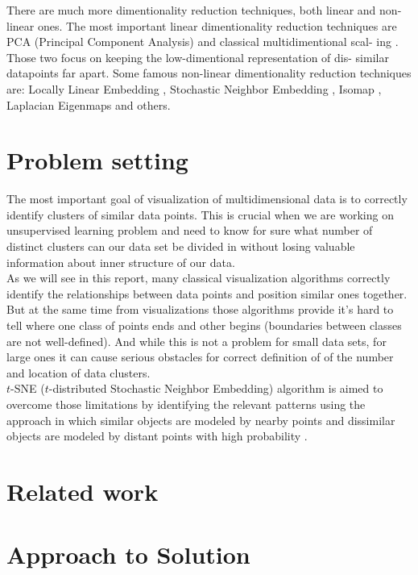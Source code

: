 There are much more dimentionality reduction techniques, both linear and
non-linear ones. The most important linear dimentionality reduction techniques
are PCA (Principal Component Analysis)\cite{pca} and classical multidimentional scal-
ing \cite{mds}. Those two focus on keeping the low-dimentional representation of dis-
similar datapoints far apart. Some famous non-linear dimentionality reduction
techniques are: Locally Linear Embedding \cite{lle}, Stochastic Neighbor Embedding \cite{snearticle}, Isomap \cite{isomap}, Laplacian Eigenmaps \cite{lapeig} and others.

\section{Problem setting}

The most important goal of visualization of multidimensional data is to correctly identify clusters of similar data points. This is crucial when we are working on unsupervised learning problem and need to know for sure what number of distinct clusters can our data set be divided in without losing valuable information about inner structure of our data.\\

 As we will see in this report, many classical visualization algorithms correctly identify the relationships between data points and position similar ones together. But at the same time from visualizations those algorithms provide it's hard to tell where one class of points ends and other begins (boundaries between classes are not well-defined). And while this is not a problem for small data sets, for large ones it can cause serious obstacles for correct definition of of the number and location of data clusters. \\

$t$-SNE ($t$-distributed Stochastic Neighbor Embedding) algorithm is aimed to overcome those limitations by identifying the relevant patterns using the approach in which similar objects are modeled by nearby points and dissimilar objects are modeled by distant points with high probability \cite{tsnearticle}. 

\section{Related work}

\section{Approach to Solution}

